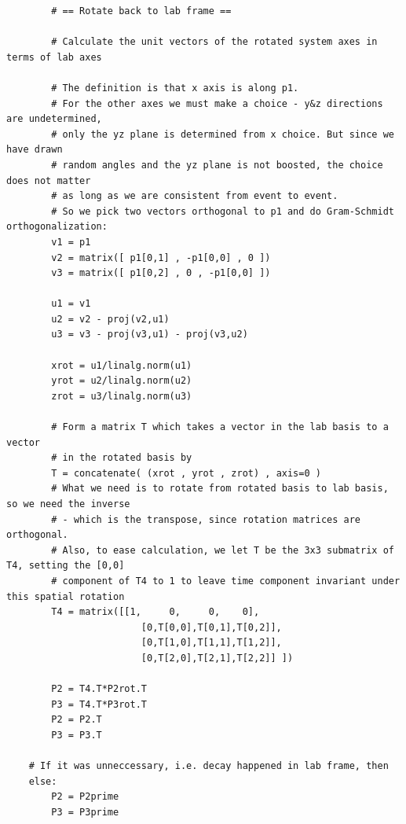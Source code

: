 \documentclass[twoside,english]{uiofysmaster}
\begin{document}
\begin{lstlisting}
		# == Rotate back to lab frame ==

		# Calculate the unit vectors of the rotated system axes in terms of lab axes

		# The definition is that x axis is along p1.
		# For the other axes we must make a choice - y&z directions are undetermined,
		# only the yz plane is determined from x choice. But since we have drawn 
		# random angles and the yz plane is not boosted, the choice does not matter
		# as long as we are consistent from event to event.
		# So we pick two vectors orthogonal to p1 and do Gram-Schmidt orthogonalization:
		v1 = p1
		v2 = matrix([ p1[0,1] , -p1[0,0] , 0 ])
		v3 = matrix([ p1[0,2] , 0 , -p1[0,0] ])

		u1 = v1
		u2 = v2 - proj(v2,u1)
		u3 = v3 - proj(v3,u1) - proj(v3,u2)

		xrot = u1/linalg.norm(u1)
		yrot = u2/linalg.norm(u2)
		zrot = u3/linalg.norm(u3)

		# Form a matrix T which takes a vector in the lab basis to a vector 
		# in the rotated basis by
		T = concatenate( (xrot , yrot , zrot) , axis=0 )
		# What we need is to rotate from rotated basis to lab basis, so we need the inverse
		# - which is the transpose, since rotation matrices are orthogonal. 
		# Also, to ease calculation, we let T be the 3x3 submatrix of T4, setting the [0,0]
		# component of T4 to 1 to leave time component invariant under this spatial rotation
		T4 = matrix([[1,     0,     0,    0],
						[0,T[0,0],T[0,1],T[0,2]],
						[0,T[1,0],T[1,1],T[1,2]],
						[0,T[2,0],T[2,1],T[2,2]] ])

		P2 = T4.T*P2rot.T
		P3 = T4.T*P3rot.T
		P2 = P2.T
		P3 = P3.T

	# If it was unneccessary, i.e. decay happened in lab frame, then
	else:
		P2 = P2prime
		P3 = P3prime
\end{lstlisting}








\end{document}

